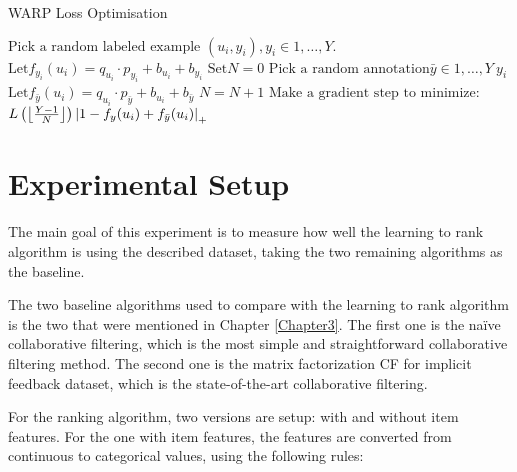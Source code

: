 \begin{algorithm}
\caption{WARP Loss Optimisation} \label{WARP}
\begin{algorithmic}[1]
	\Repeat
	\State $\text{Pick a random labeled example }(u_i, y_i), y_i \in {1, \ldots, Y}.$
	\State $\text{Let} f_{y_i}(u_i) = q_{u_i} \cdot p_{y_i} + b_{u_i} + b_{y_i}$
	\State $\text{Set} N = 0$
	\Repeat
		\State $\text{Pick a random annotation} \bar{y} \in {1, \ldots, Y} \ y_i$
		\State $\text{Let} f_{\bar{y}} (u_i) = q_{u_i} \cdot p_{\bar{y}} + b_{u_i} + b_{\bar{y}}$
		\State $N = N + 1$
		\State $\text{Make a gradient step to minimize:}$
		\State $L \left( \floor*{\frac{Y-1}{N}} \right) {\lvert 1 - f_y(u_i) + f_{\bar{y}} (u_i) \rvert}_+$	
	\EndIf
\EndFunction
\end{algorithmic}
\end{algorithm}

\section{Experimental Setup}
The main goal of this experiment is to measure how well the learning to rank algorithm is using the described dataset, taking the two remaining algorithms as the baseline. 

\noindent The two baseline algorithms used to compare with the learning to rank algorithm is the two that were mentioned in Chapter \ref{Chapter3}. The first one is the na\"ive collaborative filtering, which is the most simple and straightforward collaborative filtering method. The second one is the matrix factorization CF for implicit feedback dataset, which is the state-of-the-art collaborative filtering.

\noindent For the ranking algorithm, two versions are setup: with and without item features. For the one with item features, the features are converted from continuous to categorical values, using the following rules:

